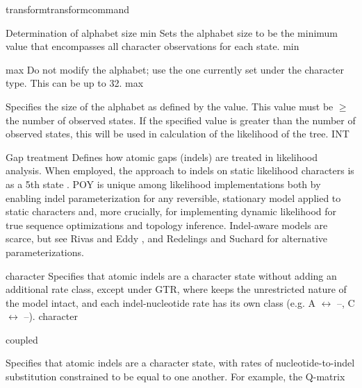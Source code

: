 \begin{command}{transform}{transformcommand}
\begin{arguments}
\begin{argumentgroup}{Determination of alphabet size}
             {\obligatory min}
                {Sets the alphabet size to be the minimum value that
                encompasses all character observations for each state.}
                {min}

             {\obligatory max}
                {Do not modify the alphabet; use the one currently
                set under the character type. This can be up to 32.}%
                {max}

             {\obligatory{\poyint}}
                {Specifies the size of the alphabet as defined by the \poyint value. 
                This value must be $ \geq $ the number of observed states.
               If the specified value is greater than the number of observed states, 
                this \poyint will be used in  calculation of the likelihood of the tree.}
                {INT}

        \end{argumentgroup}

        \begin {argumentgroup} {Gap treatment}
            Defines how atomic gaps (indels) are treated in
            likelihood analysis. When employed, the \poy approach to
            indels on static likelihood characters is as a 5th state 
            \cite{mcguire2001models,Wheeler2006}. 
            POY is unique among likelihood implementations both
            by enabling indel parameterization for any reversible,
            stationary model applied to static characters and, more
            crucially, for implementing dynamic likelihood for true
            sequence optimizations and topology inference. Indel-aware
            models are scarce, but see Rivas and Eddy \cite{rivas2008probabilistic}, 
            and Redelings and Suchard \cite{redelings2005joint,redelings2007incorporating}
            for alternative parameterizations.

             {\obligatory character}
                {Specifies that atomic indels are a character state
                without adding an additional rate class, except
                under GTR, where \poy keeps the unrestricted nature of the
                model intact, and each indel-nucleotide rate has its
                own class (e.g. A $\leftrightarrow$ --, C $\leftrightarrow$ --).}
                {character}
                        
             {\obligatory coupled}
                {Specifies that atomic indels are a character state,
                with rates of nucleotide-to-indel substitution
                constrained to be equal to one another. For example,
                the Q-matrix

}
\end{argumentgroup}
\end{arguments}
\end{command}
